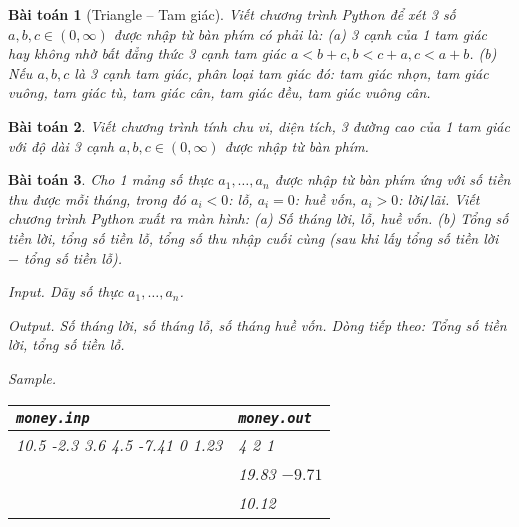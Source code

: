 \documentclass{article}
\newtheorem{baitoan}{Bài toán}
\begin{document}
\begin{baitoan}[Triangle -- Tam giác]
	 Viết chương trình Python để xét 3 số $a,b,c\in(0,\infty)$ được nhập từ bàn phím có phải là: (a) 3 cạnh của 1 tam giác hay không nhờ bất đẳng thức 3 cạnh tam giác $a < b + c,b < c + a,c < a + b$. (b) Nếu $a,b,c$ là 3 cạnh tam giác, phân loại tam giác đó: tam giác nhọn, tam giác vuông, tam giác tù, tam giác cân, tam giác đều, tam giác vuông cân.
\end{baitoan}

\begin{baitoan}
	Viết chương trình tính chu vi, diện tích, 3 đường cao của 1 tam giác với độ dài 3 cạnh $a,b,c\in(0,\infty)$ được nhập từ bàn phím.
\end{baitoan}

\begin{baitoan}
	Cho 1 mảng số thực $a_1,\ldots,a_n$ được nhập từ bàn phím ứng với số tiền thu được mỗi tháng, trong đó $a_i < 0$: lỗ, $a_i = 0$: huề vốn, $a_i > 0$: lời{\tt/}lãi. Viết chương trình Python xuất ra màn hình: (a) Số tháng lời, lỗ, huề vốn. (b) Tổng số tiền lời, tổng số tiền lỗ, tổng số thu nhập cuối cùng (sau khi lấy tổng số tiền lời $-$ tổng số tiền lỗ).
	\item {\sf Input.} Dãy số thực $a_1,\ldots,a_n$.
	\item {\sf Output.} Số tháng lời, số tháng lỗ, số tháng huề vốn. Dòng tiếp theo: Tổng số tiền lời, tổng số tiền lỗ.
	\item {\sf Sample.}
	\begin{table}[H]
		\centering
		\begin{tabular}{|l|l|}
			\hline
			{\tt money.inp} & {\tt money.out} \\
			\hline
			10.5 -2.3 3.6 4.5 -7.41 0 1.23 & 4 2 1 \\
			& 19.83 $-9.71$ \\
			& 10.12 \\
			\hline
		\end{tabular}
	\end{table}
\end{baitoan}
\end{document}
